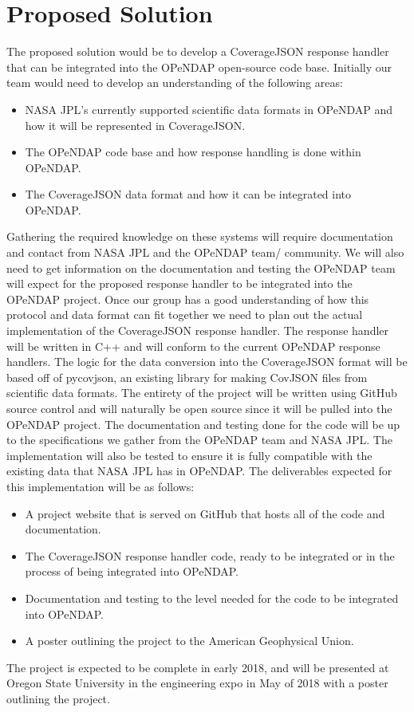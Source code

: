 \documentclass[letterpaper,10pt,draftclsnofoot,onecolumn]{IEEEtran}
\begin{document}
\section{Proposed Solution}
The proposed solution would be to develop a CoverageJSON response handler that can be integrated into the OPeNDAP open-source code base.
Initially our team would need to develop an understanding of the following areas:
 \begin{itemize}
  \item NASA JPL's currently supported scientific data formats in OPeNDAP and how it will be represented in CoverageJSON.
  \item The OPeNDAP code base and how response handling is done within OPeNDAP.
  \item The CoverageJSON data format and how it can be integrated into OPeNDAP.
\end{itemize}
Gathering the required knowledge on these systems will require documentation and contact from NASA JPL and the OPeNDAP team/ community. We will also need to get information on the documentation and testing the OPeNDAP team will expect for the proposed response handler to be integrated into the OPeNDAP project. Once our group has a good understanding of how this protocol and data format can fit together we need to plan out the actual implementation of the CoverageJSON response handler. The response handler will be written in C++ and will conform to the current OPeNDAP response handlers. The logic for the data conversion into the CoverageJSON format will be based off of pycovjson, an existing library for making CovJSON files from scientific data formats. The entirety of the project will be written using GitHub source control and will naturally be open source since it will be pulled into the OPeNDAP project. The documentation and testing done for the code will be up to the specifications we gather from the OPeNDAP team and NASA JPL. The implementation will also be tested to ensure it is fully compatible with the existing data that NASA JPL has in OPeNDAP. The deliverables expected for this implementation will be as follows:
 \begin{itemize}
  \item A project website that is served on GitHub that hosts all of the code and documentation.
  \item The CoverageJSON response handler code, ready to be integrated or in the process of being integrated into OPeNDAP.
  \item Documentation and testing to the level needed for the code to be integrated into OPeNDAP.
  \item A poster outlining the project to the American Geophysical Union.
\end{itemize}
The project is expected to be complete in early 2018, and will be presented at Oregon State University in the engineering expo in May of 2018 with a poster outlining the project.
\end{document}
